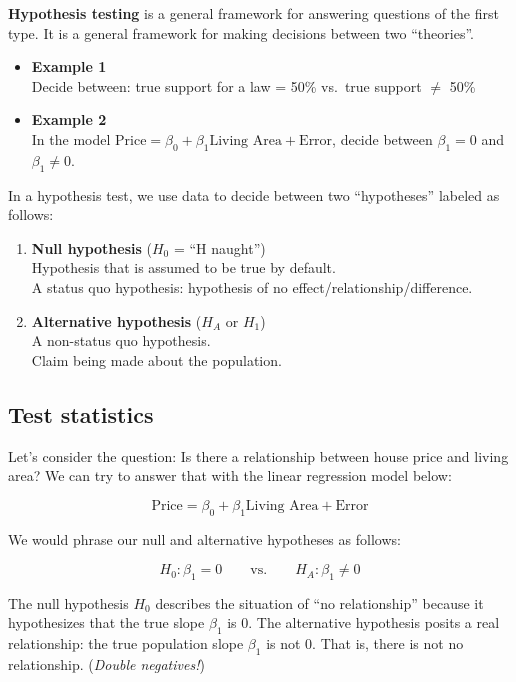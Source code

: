 \documentclass[]{book}
\begin{document}
\textbf{Hypothesis testing} is a general framework for answering questions of the first type. It is a general framework for making decisions between two ``theories''.

\begin{itemize}
\item
  \textbf{Example 1}\\
  Decide between: true support for a law = 50\% vs.~true support \(\neq\) 50\%
\item
  \textbf{Example 2}\\
  In the model \(\text{Price} = \beta_0 + \beta_1\text{Living Area} + \text{Error}\), decide between \(\beta_1 = 0\) and \(\beta_1 \neq 0\).
\end{itemize}

In a hypothesis test, we use data to decide between two ``hypotheses'' labeled as follows:

\begin{enumerate}
\def\labelenumi{\arabic{enumi}.}
\item
  \textbf{Null hypothesis} (\(H_0\) = ``H naught'')\\
  Hypothesis that is assumed to be true by default.\\
  A status quo hypothesis: hypothesis of no effect/relationship/difference.
\item
  \textbf{Alternative hypothesis} (\(H_A\) or \(H_1\))\\
  A non-status quo hypothesis.\\
  Claim being made about the population.
\end{enumerate}

\hypertarget{test-statistics}{%
\subsection{Test statistics}\label{test-statistics}}

Let's consider the question: Is there a relationship between house price and living area? We can try to answer that with the linear regression model below:

\[\text{Price} = \beta_0 + \beta_1\text{Living Area} + \text{Error}\]

We would phrase our null and alternative hypotheses as follows:

\[H_0: \beta_1 = 0 \qquad \text{vs.} \qquad H_A: \beta_1 \neq 0\]

The null hypothesis \(H_0\) describes the situation of ``no relationship'' because it hypothesizes that the true slope \(\beta_1\) is 0. The alternative hypothesis posits a real relationship: the true population slope \(\beta_1\) is not 0. That is, there is not no relationship. (\emph{Double negatives!})
\end{document}
